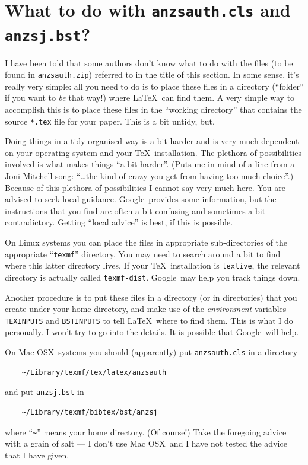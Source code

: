 \documentclass[times, doublespace]{anzsauth}
\begin{document}
\section{What to do with \texttt{anzsauth.cls} and \texttt{anzsj.bst}?}
\label{sec:wheretoshove}

I have been told that some authors don't know what to do with the
files (to be found in \texttt{anzsauth.zip}) referred to in the
title of this section.  In some sense, it's really very simple:  all
you need to do is to place these files in a directory (``folder''
if you want to \emph{be} that way!) where \LaTeX\ can find them.
A very simple way to accomplish this is to place these files in
the ``working directory'' that contains the source \texttt{*.tex}
file for your paper.  This is a bit untidy, but.

Doing things in a tidy organised way is a bit harder and is very
much dependent on your operating system and your \TeX\ installation.
The plethora of possibilities involved is what makes things ``a
bit harder''.  (Puts me in mind of a line from a Joni Mitchell song:
``\ldots the kind of crazy you get from having too much choice''.)
Because of this plethora of possibilities I cannot say very much
here.  You are advised to seek local guidance.  Google\texttrademark\
provides some information, but the instructions that you find
are often a bit confusing and sometimes a bit contradictory.
Getting ``local advice'' is best, if this is possible.

On Linux systems you can place the files in appropriate
sub-directories of the appropriate ``\texttt{texmf}'' directory.
You may need to search around a bit to find where this latter
directory lives.  If your \TeX\ installation is \texttt{texlive},
the relevant directory is actually called \texttt{texmf-dist}.
Google\texttrademark\ may help you track things down.

Another procedure is to put these files in a directory (or in
directories) that you create under your home directory, and make
use of the \emph{environment} variables \texttt{TEXINPUTS} and
\texttt{BSTINPUTS} to tell \LaTeX\ where to find them.  This is
what I do personally.  I won't try to go into the details.  It
is possible that Google\texttrademark\ will help.

On Mac OSX\texttrademark\ systems you should (apparently)
put \texttt{anzsauth.cls} in a directory
\begin{verbatim}
    ~/Library/texmf/tex/latex/anzsauth
\end{verbatim}
and put \texttt{anzsj.bst} in
\begin{verbatim}
    ~/Library/texmf/bibtex/bst/anzsj
\end{verbatim}
where ``\verb!~!'' means your home directory.  (Of course!)
Take the foregoing advice with a grain of salt --- I don't use
Mac OSX\texttrademark\ and I have not tested the advice that
I have given.
\end{document}
